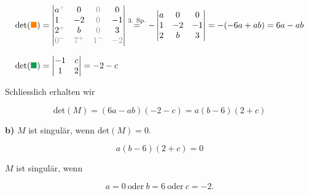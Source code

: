 \begin{solution}
    \begin{equation*}
        \begin{aligned}
            \text{det}(\textcolor{orange}{\blacksquare}) &= \begin{vmatrix}
            a^{\textcolor{Gray}{+}} & 0 & \textcolor{Gray}{0} & 0 \\
            1^{\textcolor{Gray}{-}} & -2 & \textcolor{Gray}{0} & -1 \\
            2^{\textcolor{Gray}{+}} & b & \textcolor{Gray}{0} & 3 \\
            \textcolor{Gray}{0^-} & \textcolor{Gray}{7^+} & \textcolor{Gray}{1^-} & \textcolor{Gray}{-2} 
            \end{vmatrix} \stackrel{\mathrm{\text{3. Sp.}}}{=} - \begin{vmatrix}
                a & 0 & 0 \\
                1 & -2 & -1 \\
                2 & b & 3 
            \end{vmatrix} = - (-6a + ab) = 6a-ab \\[0.75em]
            \text{det}(\textcolor{ForestGreen}{\blacksquare}) &= \begin{vmatrix}
                -1 & c \\
                1 & 2
            \end{vmatrix} = -2 - c
        \end{aligned}
    \end{equation*}

    Schliesslich erhalten wir 

    \begin{equation*}
        \text{det}(M) = (6a - ab)(-2 - c) = a(b-6)(2+c)
    \end{equation*}

    \vspace{1\baselineskip}

    \textbf{b)} \(M\) ist singulär, wenn \(\text{det}(M) = 0\). 

    \begin{equation*}
        a(b-6)(2+c) = 0
    \end{equation*}

    \( M \) ist singulär, wenn

    \begin{equation*}
        a = 0 \ \text{oder} \ b = 6 \ \text{oder} \ c = -2.
    \end{equation*}

\end{solution}

